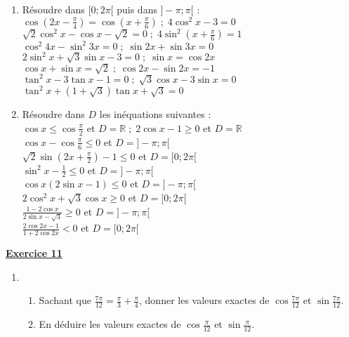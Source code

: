 \documentclass[12pt,a4paper]{article}
\begin{document}
\begin{multicols}{2}
\begin{enumerate}
    \item Résoudre dans \( [0 ; 2\pi[ \) puis dans \( ]-\pi ; \pi[ \) :\\
    \( \cos\left( 2x - \frac{\pi}{4} \right) = \cos\left( x + \frac{\pi}{6} \right) \;;\; 4\cos^2 x - 3 = 0 \)\\
    \( \sqrt{2} \cos^2 x - \cos x - \sqrt{2} = 0 \;;\; 4\sin^2\left( x + \frac{\pi}{6} \right) = 1 \)\\
    \( \cos^2 4x - \sin^2 3x = 0 \;;\; \sin 2x + \sin 3x = 0 \)\\
    \( 2\sin^2 x + \sqrt{3} \sin x - 3 = 0 \;;\; \sin x = \cos 2x \)\\
    \( \cos x + \sin x = \sqrt{2} \;;\; \cos 2x - \sin 2x = -1 \)\\
    \( \tan^2 x - 3 \tan x - 1 = 0 \;;\; \sqrt{3} \cos x - 3 \sin x = 0 \)\\
    \( \tan^2 x + (1 + \sqrt{3}) \tan x + \sqrt{3} = 0 \)

    \item Résoudre dans \( D \) les inéquations suivantes :\\
    \( \cos x \leq \cos \frac{\pi}{2} \) et \( D = \mathbb{R} \;;\; 2\cos x - 1 \geq 0 \) et \( D = \mathbb{R} \)\\
    \( \cos x - \cos \frac{\pi}{6} \leq 0 \) et \( D = ]-\pi ; \pi[ \)\\
    \( \sqrt{2} \sin\left( 2x + \frac{\pi}{2} \right) - 1 \leq 0 \) et \( D = [0 ; 2\pi[ \)\\
    \( \sin^2 x - \frac{1}{2} \leq 0 \) et \( D = ]-\pi ; \pi[ \)\\
    \( \cos x (2 \sin x - 1) \leq 0 \) et \( D = ]-\pi ; \pi[ \)\\
    \( 2 \cos^2 x + \sqrt{3} \cos x \geq 0 \) et \( D = [0 ; 2\pi[ \)\\
    \( \frac{1 - 2\cos x}{2 \sin x - \sqrt{3}} \geq 0 \) et \( D = ]-\pi ; \pi[ \)\\
    \( \frac{2 \cos 2x - 1}{1 + 2 \cos 2x} < 0 \) et \( D = [0 ; 2\pi[ \)
\end{enumerate}
\textbf{\underline{Exercice 11}}
\begin{enumerate}
    \item 
    \begin{enumerate}
        \item Sachant que \( \frac{7\pi}{12} = \frac{\pi}{3} + \frac{\pi}{4} \), donner les valeurs exactes de \( \cos \frac{7\pi}{12} \) et \( \sin \frac{7\pi}{12} \).
        \item En déduire les valeurs exactes de \( \cos \frac{\pi}{12} \) et \( \sin \frac{\pi}{12} \).
    \end{enumerate}


\end{enumerate}
\end{multicols}
\end{document}
